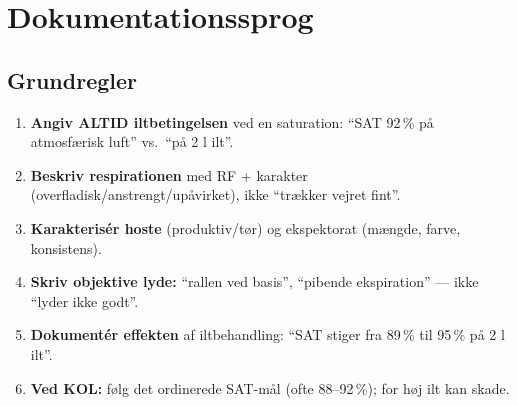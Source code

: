 \documentclass[11pt,a4paper]{report}
\begin{document}
\section{Dokumentationssprog}
\subsection{Grundregler}
\begin{enumerate}[leftmargin=1.4em,itemsep=4pt]
\item \textbf{Angiv ALTID iltbetingelsen} ved en saturation: ``SAT 92\,\% på atmosfærisk luft'' vs.\ ``på 2 l ilt''.
\item \textbf{Beskriv respirationen} med RF + karakter (overfladisk/anstrengt/upåvirket), ikke ``trækker vejret fint''.
\item \textbf{Karakterisér hoste} (produktiv/tør) og ekspektorat (mængde, farve, konsistens).
\item \textbf{Skriv objektive lyde:} ``rallen ved basis'', ``pibende ekspiration'' --- ikke ``lyder ikke godt''.
\item \textbf{Dokumentér effekten} af iltbehandling: ``SAT stiger fra 89\,\% til 95\,\% på 2 l ilt''.
\item \textbf{Ved KOL:} følg det ordinerede SAT-mål (ofte 88--92\,\%); for høj ilt kan skade.
\end{enumerate}
\end{document}
